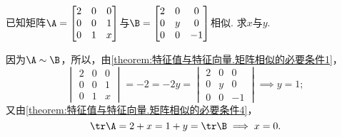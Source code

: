 \begin{example}
已知矩阵\(\A = \begin{bmatrix}
	2 & 0 & 0 \\
	0 & 0 & 1 \\
	0 & 1 & x
\end{bmatrix}\)与\(\B = \begin{bmatrix}
	2 & 0 & 0 \\
	0 & y & 0 \\
	0 & 0 & -1
\end{bmatrix}\)相似.
求\(x\)与\(y\).
\begin{solution}
因为\(\A\sim\B\)，所以，由\cref{theorem:特征值与特征向量.矩阵相似的必要条件1}，
\[
	\begin{vmatrix}
		2 & 0 & 0 \\
		0 & 0 & 1 \\
		0 & 1 & x
	\end{vmatrix}
	= -2 = -2y =
	\begin{vmatrix}
		2 & 0 & 0 \\
		0 & y & 0 \\
		0 & 0 & -1
	\end{vmatrix}
	\implies y = 1;
\]
又由\cref{theorem:特征值与特征向量.矩阵相似的必要条件4}，
\[
	\tr\A = 2+x
	= 1+y = \tr\B
	\implies
	x = 0.
\]
\end{solution}
\end{example}
